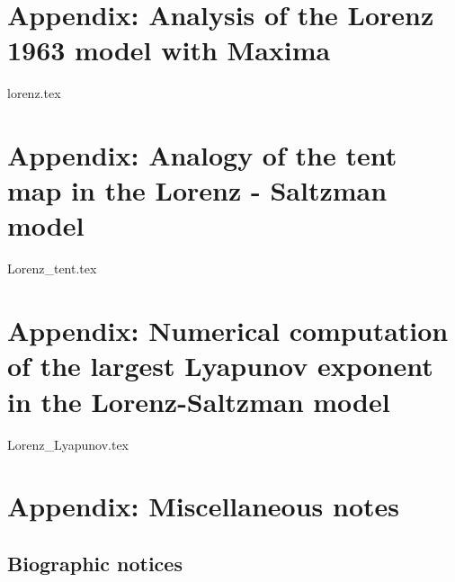 \documentclass[fleqn,twoside]{mc}
\newcommand{\sectionbreak}{\clearpage\stepcounter{secshift}}
\newcounter{secshift}
\begin{document}
\appendix

\captionsetup{format=nocaption,aboveskip=0pt,belowskip=0pt}
\section{Appendix: Analysis of the Lorenz 1963 model with Maxima}
\label{appendix:maxima}
\small



{lorenz.tex}

\section{Appendix: Analogy of the tent map in the Lorenz - Saltzman model}

{Lorenz_tent.tex}
\label{appendix:tent}
\small

\section{Appendix: Numerical computation of the largest Lyapunov exponent in the Lorenz-Saltzman model}\label{appendix:lyapunov}

{Lorenz_Lyapunov.tex}

\section{Appendix: Miscellaneous notes}

\subsection{Biographic notices}
\renewcommand{\sectionbreak}{\stepcounter{secshift}}





\setlength\parskip{6pt}
\listofdfcounter
\listoftcounter
%



\printindex
\end{document}
